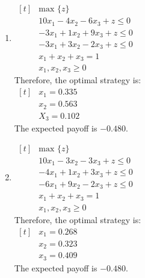 \documentclass[11pt]{article}
\begin{document}
\begin{enumerate}[label=(\alph*)]
\item
$\begin{aligned}[t]
& \text{max \{}z\text{\}} &\\
& 10x_1 - 4x_2 - 6x_3 + z \leq 0 &\\
& -3x_1 + 1x_2 + 9x_3 + z \leq 0 &\\
& -3x_1 + 3x_2 - 2x_3 + z \leq 0 &\\
& x_1 + x_2 + x_3 = 1 &\\
& x_1, x_2, x_3 \geq 0
\end{aligned}$
\vspace*{1\baselineskip}
\\
Therefore, the optimal strategy is:
\\
$\begin{aligned}[t]
& x_1 = 0.335 &\\
& x_2 = 0.563 &\\
& X_3 = 0.102
\end{aligned}$
\vspace*{1\baselineskip}
\\
The expected payoff is $-0.480$.



\item
$\begin{aligned}[t]
& \text{max \{}z\text{\}} &\\
& 10x_1 - 3x_2 - 3x_3 + z \leq 0 &\\
& -4x_1 + 1x_2 + 3x_3 + z \leq 0 &\\
& -6x_1 + 9x_2 - 2x_3 + z \leq 0 &\\
& x_1 + x_2 + x_3 = 1 &\\
& x_1, x_2, x_3 \geq 0
\end{aligned}$
\vspace*{1\baselineskip}
\\
Therefore, the optimal strategy is:
\\
$\begin{aligned}[t]
& x_1 = 0.268 &\\
& x_2 = 0.323 &\\
& x_3 = 0.409
\end{aligned}$
\vspace*{1\baselineskip}
\\
The expected payoff is $-0.480$.
\end{enumerate}



\newpage
\end{document}
